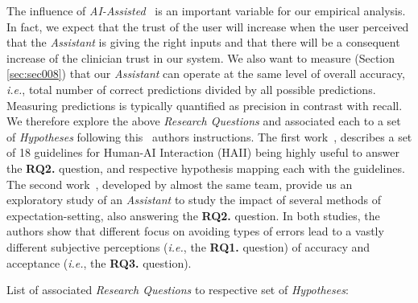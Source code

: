 \hfill

The influence of \textit{AI-Assisted}~\cite{goodfellow2016deep} is an important variable for our empirical analysis. In fact, we expect that the trust of the user will increase when the user perceived that the \textit{Assistant} is giving the right inputs and that there will be a consequent increase of the clinician trust in our system. We also want to measure (Section \ref{sec:sec008}) that our \textit{Assistant} can operate at the same level of overall accuracy, {\it i.e.}, total number of correct predictions divided by all possible predictions. Measuring predictions is typically quantified as precision in contrast with recall. We therefore explore the above {\it Research Questions} and associated each to a set of {\it Hypotheses} following this~\cite{amershi2019guidelines, kocielnik2019will} authors instructions. The first work~\cite{amershi2019guidelines}, describes a set of 18 guidelines for Human-AI Interaction (HAII) being highly useful to answer the {\bf RQ2.} question, and respective hypothesis mapping each with the guidelines. The second work~\cite{kocielnik2019will}, developed by almost the same team, provide us an exploratory study of an {\it Assistant} to study the impact of several methods of expectation-setting, also answering the {\bf RQ2.} question. In both studies, the authors show that different focus on avoiding types of errors lead to a vastly different subjective perceptions ({\it i.e.}, the {\bf RQ1.} question) of accuracy and acceptance ({\it i.e.}, the {\bf RQ3.} question).

\clearpage

List of associated {\it Research Questions} to respective set of {\it Hypotheses}:

